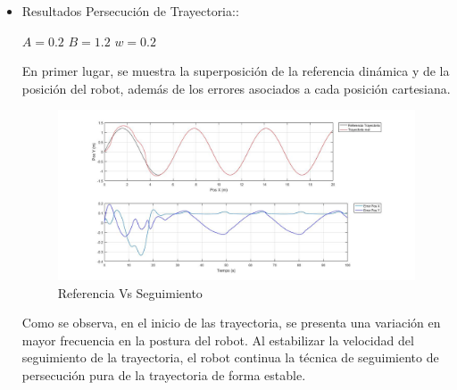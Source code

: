 \documentclass[a4paper,twoside]{article}
\begin{document}
\newpage	
	\begin{itemize}
		
		\item Resultados Persecución de Trayectoria::
	\begin{center}
		$A=0.2$    \hspace{0.2cm}   
		$B=1.2$    \hspace{0.2cm} 
		$w=0.2$ \\
	\end{center}

	En primer lugar, se muestra la superposición de la referencia dinámica y de la posición del 
	robot, además de los errores asociados a cada posición cartesiana.\\


	\begin{figure}[h!]
		\centering
		\includegraphics[width=1\textwidth]{PurePursuitSeguimiento_Error}
		\caption{Referencia Vs Seguimiento}
	\end{figure}

	Como se observa, en el inicio de las trayectoria, se presenta una variación en mayor frecuencia
	en la postura del robot. Al estabilizar la velocidad del seguimiento de la trayectoria,
	el robot continua la técnica de seguimiento de persecución pura de la trayectoria de forma estable.\\


\end{itemize}
\end{document}
